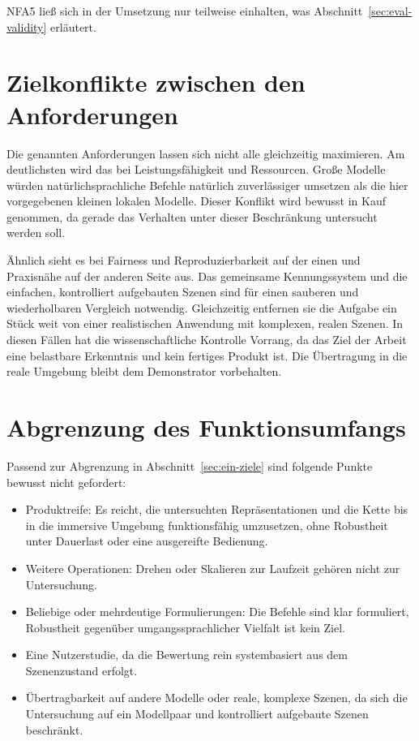 NFA5 ließ sich in der Umsetzung nur teilweise einhalten, was Abschnitt~\ref{sec:eval-validity} erläutert.


\section{Zielkonflikte zwischen den Anforderungen}
\label{sec:anf-spannungen}

Die genannten Anforderungen lassen sich nicht alle gleichzeitig maximieren.
Am deutlichsten wird das bei Leistungsfähigkeit und Ressourcen.
Große Modelle würden natürlichsprachliche Befehle natürlich zuverlässiger umsetzen als die hier vorgegebenen kleinen lokalen Modelle.
Dieser Konflikt wird bewusst in Kauf genommen, da gerade das Verhalten unter dieser Beschränkung untersucht werden soll.

Ähnlich sieht es bei Fairness und Reproduzierbarkeit auf der einen und Praxisnähe auf der anderen Seite aus.
Das gemeinsame Kennungssystem und die einfachen, kontrolliert aufgebauten Szenen sind für einen sauberen und wiederholbaren Vergleich notwendig.
Gleichzeitig entfernen sie die Aufgabe ein Stück weit von einer realistischen Anwendung mit komplexen, realen Szenen.
In diesen Fällen hat die wissenschaftliche Kontrolle Vorrang, da das Ziel der Arbeit eine belastbare Erkenntnis und kein fertiges Produkt ist.
Die Übertragung in die reale Umgebung bleibt dem Demonstrator vorbehalten.


\section{Abgrenzung des Funktionsumfangs}
\label{sec:anf-abgrenzung}

Passend zur Abgrenzung in Abschnitt~\ref{sec:ein-ziele} sind folgende Punkte bewusst nicht gefordert:
\begin{itemize}
  \item Produktreife: Es reicht, die untersuchten Repräsentationen und die Kette bis in die immersive Umgebung funktionsfähig umzusetzen, ohne Robustheit unter Dauerlast oder eine ausgereifte Bedienung.
  \item Weitere Operationen: Drehen oder Skalieren zur Laufzeit gehören nicht zur Untersuchung.
  \item Beliebige oder mehrdeutige Formulierungen: Die Befehle sind klar formuliert, Robustheit gegenüber umgangssprachlicher Vielfalt ist kein Ziel.
  \item Eine Nutzerstudie, da die Bewertung rein systembasiert aus dem Szenenzustand erfolgt.
  \item Übertragbarkeit auf andere Modelle oder reale, komplexe Szenen, da sich die Untersuchung auf ein Modellpaar und kontrolliert aufgebaute Szenen beschränkt.
\end{itemize}
